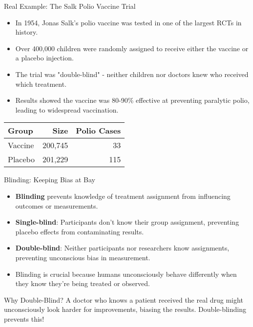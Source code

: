 \documentclass{beamer}
\begin{document}
	\begin{frame}{Real Example: The Salk Polio Vaccine Trial}
		\begin{itemize}
			\item In 1954, Jonas Salk's polio vaccine was tested in one of the largest RCTs in history.
			\item Over 400,000 children were randomly assigned to receive either the vaccine or a placebo injection.
			\item The trial was "double-blind" - neither children nor doctors knew who received which treatment.
			\item Results showed the vaccine was 80-90\% effective at preventing paralytic polio, leading to widespread vaccination.
		\end{itemize}
		
		\begin{example}
			\begin{tabular}{l|r|r}
				Group & Size & Polio Cases \\
				\hline
				Vaccine & 200,745 & 33 \\
				Placebo & 201,229 & 115 \\
				\hline
			\end{tabular}
			\vspace{0.2cm}
			
		\end{example}
	\end{frame}
	
	\begin{frame}{Blinding: Keeping Bias at Bay}
		\begin{itemize}
			\item \textbf{Blinding} prevents knowledge of treatment assignment from influencing outcomes or measurements.
			\item \textbf{Single-blind}: Participants don't know their group assignment, preventing placebo effects from contaminating results.
			\item \textbf{Double-blind}: Neither participants nor researchers know assignments, preventing unconscious bias in measurement.
			\item Blinding is crucial because humans unconsciously behave differently when they know they're being treated or observed.
		\end{itemize}
		
		\begin{alertblock}{Why Double-Blind?}
			A doctor who knows a patient received the real drug might unconsciously look harder for improvements, biasing the results. Double-blinding prevents this!
		\end{alertblock}
	\end{frame}
	
\end{document}
